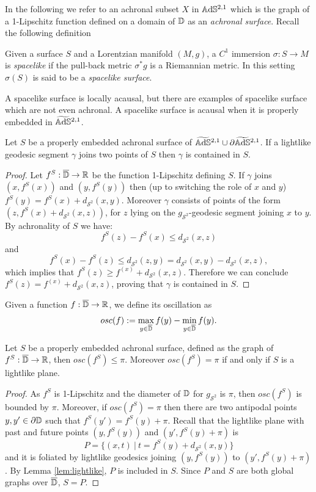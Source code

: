 In the following we refer to an achronal subset $X$ in $\mathbb{A}\mathrm{d}\mathbb{S}^{2,1}$ which is the graph of a 1-Lipschitz function defined on a domain of $\mathbb{D}$ as an \textit{achronal surface}. Recall the following definition
\begin{definition}
    Given a surface $S$ and a Lorentzian manifold $(M,g)$, a $C^1$ immersion $\sigma : S \to M$ is \textit{spacelike} if the pull-back metric $\sigma^* g$ is a Riemannian metric. In this setting $\sigma(S)$ is said to be a \textit{spacelike surface}.
\end{definition}
A spacelike surface is locally acausal, but there are examples of spacelike surface which are not even achronal. A spacelike surface is acausal when it is properly embedded in $\widetilde{\mathbb{A}\mathrm{d}\mathbb{S}}{}^{2,1}$. 
\begin{lemma}\label{lem:lightlike}
    Let $S$ be a properly embedded achronal surface of $\widetilde{\mathbb{A}\mathrm{d}\mathbb{S}}{}^{2,1} \cup \partial\widetilde{\mathbb{A}\mathrm{d}\mathbb{S}}{}^{2,1}$. If a lightlike geodesic segment $\gamma$ joins two points of $S$ then $\gamma$ is contained in $S$.
\end{lemma}
\begin{proof}
    Let $f^S:\overline{\mathbb{D}} \to \mathbb{R}$ be the function 1-Lipschitz defining $S$. If $\gamma$ joins $(x,f^S(x))$ and $(y,f^S(y))$ then (up to switching the role of $x$ and $y$) $f^S(y) = f^S(x) + d_{\mathcal{S}^2}(x,y)$. Moreover $\gamma$ consists of points of the form $(z,f^S(x) + d_{\mathcal{S}^2}(x,z))$, for $z$ lying on the $g_{\mathcal{S}^2}$-geodesic segment joining $x$ to $y$. By achronality of $S$ we have:
    \[
        f^S(z) - f^S(x) \leq d_{\mathcal{S}^2}(x,z)
    \]
    and 
    \[
        f^S(x) - f^S(z) \leq d_{\mathcal{S}^2}(z,y) = d_{\mathcal{S}^2}(x,y) - d_{\mathcal{S}^2}(x,z),
    \]
    which implies that $f^S(z) \geq f^(x) + d_{\mathcal{S}^2}(x,z)$. Therefore we can conclude $f^S(z) = f^(x) + d_{\mathcal{S}^2}(x,z)$, proving that $\gamma$ is contained in $S$.
\end{proof}
Given a function $f: \overline{\mathbb{D}}\to\mathbb{R}$, we define its oscillation as 
\[
    osc(f):= \max_{y\in\overline{\mathbb{D}}} f(y) - \min_{y\in\overline{\mathbb{D}}} f(y).
\]
\begin{lemma}\label{lem:osc}
    Let $S$ be a properly embedded achronal surface, defined as the graph of $f^S:\overline{\mathbb{D}} \to \mathbb{R}$, then $osc(f^S) \leq \pi$. Moreover $osc(f^S)= \pi$ if and only if $S$ is a lightlike plane.
\end{lemma}
\begin{proof}
    As $f^S$ is 1-Lipschitz and the diameter of $\mathbb{D}$ for $g_{\mathcal{S}^2}$ is $\pi$, then $osc(f^S)$ is bounded by $\pi$. Moreover, if $osc(f^S)=\pi$ then there are two antipodal points $y,y'\in \partial \mathbb{D}$ such that $f^S(y')=f^S(y) + \pi$. Recall that the lightlike plane with past and future points $(y,f^S(y))$ and $(y',f^S(y)+\pi)$ is
    \[
        P = \{ (x,t) \ | \ t=f^S(y) + d_{\mathcal{S}^2}(x,y) \}
    \]
    and it is foliated by lightlike geodesics joining $(y,f^S(y))$ to $(y',f^S(y)+\pi)$. By Lemma \ref{lem:lightlike}, $P$ is included in $S$. Since $P$ and $S$ are both global graphs over $\overline{\mathbb{D}}$, $S=P$.
\end{proof}
    


